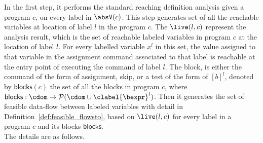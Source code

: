 In the first step, 
it performs the standard reaching definition analysis given a program $c$, 
on 
every label in $\absV(c)$.  This step generates set of all the reachable variables at location of label $l$ in the program $c$.
The $\live(l, c)$ represent the analysis result, which is the set of 
reachable labeled variables in program $c$ at the location of label $l$.
For every labelled variable $x^l$ in this set, 
the value assigned to that variable
in the assignment command associated to that label is reachable at the entry point of  executing the command of label $l$.
The block, 
is either the command of the form of assignment, skip, or a test of the form of $[b]^{l}$, 
denoted by $\mathsf{blocks}(c)$
the set of all the blocks 
in program $c$, where  $\mathsf{blocks}: \cdom \to \mathcal{P}(\cdom \cup \clabel{\bexpr}^{l})$.
Then it generates the set of feasible data-flow between labeled variables with detail in Definition~\ref{def:feasible_flowsto}, 
based on $\live(l, c)$ for every label in a program $c$ and its blocks $\mathsf{blocks}$.
\\
The details are as follows.
%
